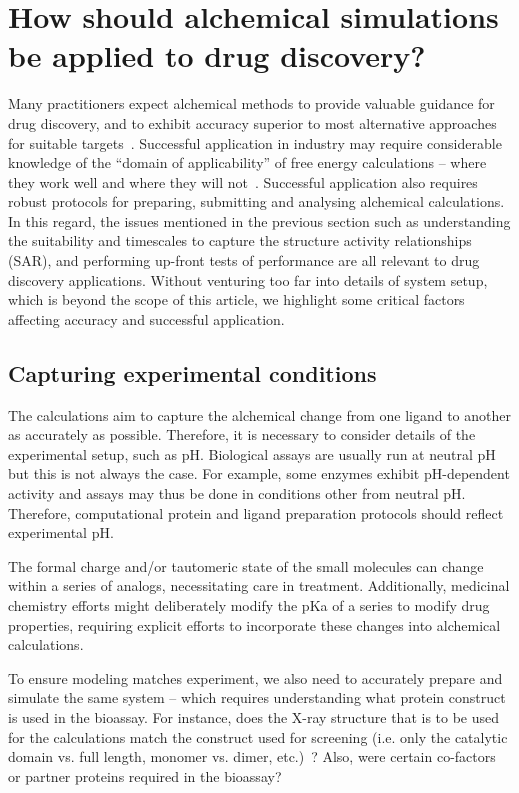 \documentclass[9pt,bestpractices]{livecoms}
\begin{document}
\section{How should alchemical simulations be applied to drug discovery?}
\label{sec:drugdiscovery}
Many practitioners expect alchemical methods to provide valuable guidance for drug discovery, and to exhibit accuracy superior to most alternative approaches for suitable targets~\cite{kuhn2017prospective}. Successful application in industry may require considerable knowledge of the ``domain of applicability'' of free energy calculations -- where they work well and where they will not~\cite{sherborne2016collaborating}. Successful application also requires robust protocols for preparing, submitting and analysing alchemical calculations. In this regard, the issues mentioned in the previous section such as understanding the suitability and timescales to capture the structure activity relationships (SAR), and performing up-front tests of performance are all relevant to drug discovery applications. Without venturing too far into details of system setup, which is beyond the scope of this article, we highlight some critical factors affecting accuracy and successful application. 

\subsection{Capturing experimental conditions}
\label{subsec:exp_condition}
The calculations aim to capture the alchemical change from one ligand to another as accurately as possible. Therefore, it is necessary to consider details of the experimental setup, such as pH. Biological assays are usually run at neutral pH but this is not always the case. For example, some enzymes exhibit pH-dependent activity and assays may thus be done in conditions other from neutral pH. Therefore, computational protein and ligand preparation protocols should reflect experimental pH. 

The formal charge and/or tautomeric state of the small molecules can change within a series of analogs, necessitating care in treatment. Additionally, medicinal chemistry efforts might deliberately modify the pKa of a series to modify drug properties, requiring explicit efforts to incorporate these changes into alchemical calculations.

To ensure modeling matches experiment, we also need to accurately prepare and simulate the same system -- which requires understanding what protein construct is used in the bioassay. For instance, does the X-ray structure that is to be used for the calculations match the construct used for screening (i.e. only the catalytic domain vs. full length, monomer vs. dimer, etc.)~\cite{perez-benito2018predicting}? Also, were certain co-factors or partner proteins required in the bioassay? 
\end{document}
